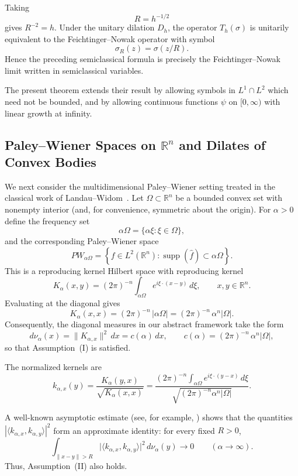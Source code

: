 \documentclass{amsart}
\theoremstyle{definition}
\theoremstyle{remark}
\numberwithin{equation}{section}
\begin{document}
Taking
\[
R=h^{-1/2}
\]
gives $R^{-2}=h$. Under the unitary dilation $D_h$, the operator
$T_h(\sigma)$ is unitarily equivalent to the Feichtinger--Nowak
operator with symbol
\[
\sigma_R(z)=\sigma(z/R).
\]
Hence the preceding semiclassical formula is precisely the
Feichtinger--Nowak limit written in semiclassical variables.

The present theorem extends their result by allowing symbols in
$L^1\cap L^2$ which need not be bounded, and by allowing continuous
functions $\psi$ on $[0,\infty)$ with linear growth at infinity.


\subsection{Paley--Wiener Spaces on $\mathbb{R}^{n}$ and Dilates of Convex Bodies}

We next consider the multidimensional Paley--Wiener setting treated in the classical
work of Landau--Widom~\cite{landau1980eigenvalue}.
Let $\Omega\subset\mathbb{R}^{n}$ be a bounded convex set with nonempty interior 
(and, for convenience, symmetric about the origin).
For $\alpha>0$ define the frequency set
\[
\alpha\Omega = \{ \alpha\xi : \xi\in\Omega\},
\]
and the corresponding Paley--Wiener space
\[
PW_{\alpha\Omega}
=
\left\{
f\in L^{2}(\mathbb{R}^{n}) : \operatorname{supp}(\widehat f)\subset \alpha\Omega
\right\}.
\]
This is a reproducing kernel Hilbert space with reproducing kernel
\[
K_{\alpha}(x,y)
=
(2\pi)^{-n}
\int_{\alpha\Omega} e^{i\xi\cdot(x-y)}\,d\xi,
\qquad x,y\in\mathbb{R}^{n}.
\]
Evaluating at the diagonal gives
\[
K_{\alpha}(x,x)
=
(2\pi)^{-n}\,|\alpha\Omega|
=
(2\pi)^{-n}\,\alpha^{n}|\Omega|.
\]
Consequently, the diagonal measures in our abstract framework take the form
\[
d\nu_{\alpha}(x)
=
\|K_{\alpha,x}\|^{2}\,dx
=
c(\alpha)\,dx,
\qquad
c(\alpha)
=
(2\pi)^{-n}\,\alpha^{n}|\Omega|,
\]
so that Assumption~\textup{(I)} is satisfied.

\medskip

The normalized kernels are
\[
k_{\alpha,x}(y)
=
\frac{K_{\alpha}(y,x)}{\sqrt{K_{\alpha}(x,x)}}
=
\frac{
(2\pi)^{-n}
\int_{\alpha\Omega} e^{i\xi\cdot(y-x)}\,d\xi}
{\sqrt{(2\pi)^{-n}\alpha^{n}|\Omega|}}.
\]

A well-known asymptotic estimate (see, for example, 
\cite[Section~3]{landau1980eigenvalue}) shows that the quantities
$|\langle k_{\alpha,x},k_{\alpha,y}\rangle|^{2}$ form an approximate identity:
for every fixed
$R>0$,
\[
\int_{\|x-y\|>R}
\bigl|\langle k_{\alpha,x},k_{\alpha,y}\rangle\bigr|^2
\,d\nu_\alpha(y)
\longrightarrow0
\qquad(\alpha\to\infty).
\]
Thus, Assumption~\textup{(II)} also holds.
\end{document}
